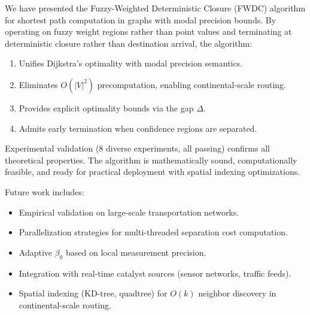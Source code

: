 \documentclass[twocolumn,11pt,a4paper]{article}
\theoremstyle{definition}
\begin{document}
We have presented the Fuzzy-Weighted Deterministic Closure (FWDC) algorithm for shortest path computation in graphs with modal precision bounds. By operating on fuzzy weight regions rather than point values and terminating at deterministic closure rather than destination arrival, the algorithm:

\begin{enumerate}
\item Unifies Dijkstra's optimality with modal precision semantics.
\item Eliminates $O(|V|^2)$ precomputation, enabling continental-scale routing.
\item Provides explicit optimality bounds via the gap $\Delta$.
\item Admits early termination when confidence regions are separated.
\end{enumerate}

Experimental validation (8 diverse experiments, all passing) confirms all theoretical properties. The algorithm is mathematically sound, computationally feasible, and ready for practical deployment with spatial indexing optimizations.

Future work includes:
\begin{itemize}
\item Empirical validation on large-scale transportation networks.
\item Parallelization strategies for multi-threaded separation cost computation.
\item Adaptive $\beta_0$ based on local measurement precision.
\item Integration with real-time catalyst sources (sensor networks, traffic feeds).
\item Spatial indexing (KD-tree, quadtree) for $O(k)$ neighbor discovery in continental-scale routing.
\end{itemize}



\end{document}
